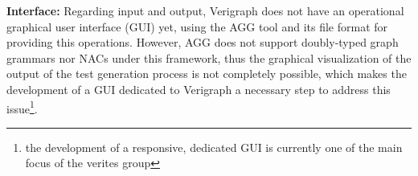 \textbf{Interface:} Regarding input and output, Verigraph does not have an operational graphical user interface (GUI) yet, using the AGG tool and its  file format for providing this operations. However, AGG does not support doubly-typed graph grammars nor NACs under this framework, thus the graphical visualization of the output of the test generation process is not completely possible, which makes the development of a GUI dedicated to Verigraph a necessary step to address this issue\footnote{the development
  of a responsive, dedicated GUI is currently one of the main focus of the verites group}.




